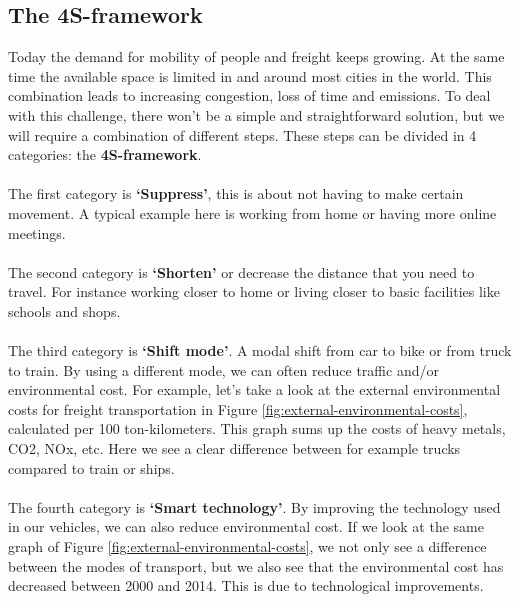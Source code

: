 \documentclass[../summary.tex]{subfiles}
\begin{document}
	\subsection{The 4S-framework}
	
	Today the demand for mobility of people and freight keeps growing. At the same time the available space is limited in and around most cities in the world. This combination leads to increasing congestion, loss of time and emissions. To deal with this challenge, there won't be a simple and straightforward solution, but we will require a combination of different steps. These steps can be divided in 4 categories: the \textbf{4S-framework}.
	\\\\
	The first category is \textbf{‘Suppress’}, this is about not having to make certain movement. A typical example here is working from home or having more online meetings.
	\\\\
	The second category is \textbf{‘Shorten’} or decrease the distance that you need to travel. For instance working closer to home or living closer to basic facilities like schools and shops.
	\\\\
	The third category is \textbf{‘Shift mode’}. A modal shift from car to bike or from truck to train. By using a different mode, we can often reduce traffic and/or environmental cost. For example, let’s take a look at the external environmental costs for freight transportation in Figure \ref{fig:external-environmental-costs}, calculated per 100 ton-kilometers. This graph sums up the costs of heavy metals, CO2, NOx, etc. Here we see a clear difference between for example trucks compared to train or ships.
	\\\\	
	The fourth category is \textbf{‘Smart technology’}. By improving the technology used in our vehicles, we can also reduce environmental cost. If we look at the same graph of Figure \ref{fig:external-environmental-costs}, we not only see a difference between the modes of transport, but we also see that the environmental cost has decreased between 2000 and 2014. This is due to technological improvements. 
	
\end{document}
